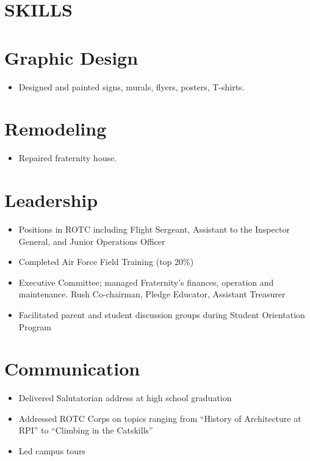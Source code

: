 \documentclass[margin]{res}
\begin{document}
\begin{resume}
\section{SKILLS} 
\normalsize{\section{Graphic Design}}
                 \begin{itemize}
                 \item Designed and painted signs, murals, flyers, 
                  posters, T-shirts. 
                 \end{itemize}
\normalsize{\section{Remodeling}} 
                 \begin{itemize}
                  \item Repaired fraternity house. 
                  \end{itemize}
\normalsize{\section{Leadership}}
	           \begin{itemize} \itemsep -2pt %
                   \item Positions in ROTC including Flight Sergeant, 
                    Assistant to the Inspector General, and 
                    Junior Operations Officer 
                  \item Completed Air Force Field Training
                       (top 20\%) 
                  \item Executive Committee; managed 
                  Fraternity's finances, operation and
                  maintenance. Rush Co-chairman, Pledge
                  Educator, Assistant Treasurer 
                   \item Facilitated parent and student discussion 
                    groups during Student Orientation Program 
                   \end{itemize}
\normalsize{\section{Communication}} 
                  \begin{itemize} \itemsep -2pt
                  \item Delivered Salutatorian address at high school 
                    graduation 
                  \item  Addressed ROTC Corps on topics ranging from 
                    ``History of Architecture at RPI'' to ``Climbing 
                    in the Catskills'' 
                  \item  Led campus tours 
                  \end{itemize} 
 

\end{resume}
\end{document}
